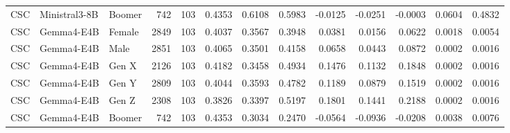 \begin{longtable}{lllrrrrrrrrrr}
CSC & Ministral3-8B & Boomer & 742 & 103 & 0.4353 & 0.6108 & 0.5983 & -0.0125 & -0.0251 & -0.0003 & 0.0604 & 0.4832 \\
CSC & Gemma4-E4B & Female & 2849 & 103 & 0.4037 & 0.3567 & 0.3948 & 0.0381 & 0.0156 & 0.0622 & 0.0018 & 0.0054 \\
CSC & Gemma4-E4B & Male & 2851 & 103 & 0.4065 & 0.3501 & 0.4158 & 0.0658 & 0.0443 & 0.0872 & 0.0002 & 0.0016 \\
CSC & Gemma4-E4B & Gen X & 2126 & 103 & 0.4182 & 0.3458 & 0.4934 & 0.1476 & 0.1132 & 0.1848 & 0.0002 & 0.0016 \\
CSC & Gemma4-E4B & Gen Y & 2809 & 103 & 0.4044 & 0.3593 & 0.4782 & 0.1189 & 0.0879 & 0.1519 & 0.0002 & 0.0016 \\
CSC & Gemma4-E4B & Gen Z & 2308 & 103 & 0.3826 & 0.3397 & 0.5197 & 0.1801 & 0.1441 & 0.2188 & 0.0002 & 0.0016 \\
CSC & Gemma4-E4B & Boomer & 742 & 103 & 0.4353 & 0.3034 & 0.2470 & -0.0564 & -0.0936 & -0.0208 & 0.0038 & 0.0076 \\
\end{longtable}
